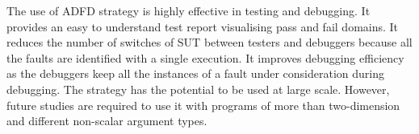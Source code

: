 The use of ADFD strategy is highly effective in testing and debugging. It provides an easy to understand test report visualising pass and fail domains. It reduces the number of switches of SUT between testers and debuggers because all the faults are identified with a single execution. It improves debugging efficiency as the debuggers keep all the instances of a fault under consideration during debugging. The strategy has the potential to be used at large scale. However, future studies are required to use it with programs of more than two-dimension and different non-scalar argument types.








